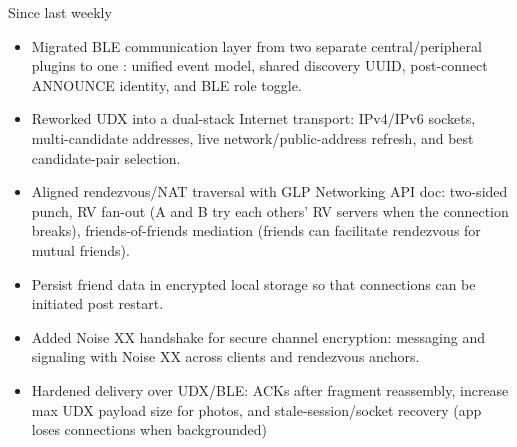 \begin{frame}{Since last weekly}
    \begin{itemize}
        \item Migrated BLE communication layer from two separate central/peripheral plugins to one : unified event model, shared discovery UUID, post-connect ANNOUNCE identity, and BLE role toggle.
        \item Reworked UDX into a dual-stack Internet transport: IPv4/IPv6 sockets, multi-candidate addresses, live network/public-address refresh, and best candidate-pair selection.
        \item Aligned rendezvous/NAT traversal with GLP Networking API doc: two-sided punch, RV fan-out (A and B try each others' RV servers when the connection breaks), friends-of-friends mediation (friends can facilitate rendezvous for mutual friends).
        \item Persist friend data in encrypted local storage so that connections can be initiated post restart.
        \item Added Noise XX handshake for secure channel encryption: messaging and signaling with Noise XX across clients and rendezvous anchors.
        \item Hardened delivery over UDX/BLE: ACKs after fragment reassembly, increase max UDX payload size for photos, and stale-session/socket recovery (app loses connections when backgrounded)
    \end{itemize}
\end{frame}

